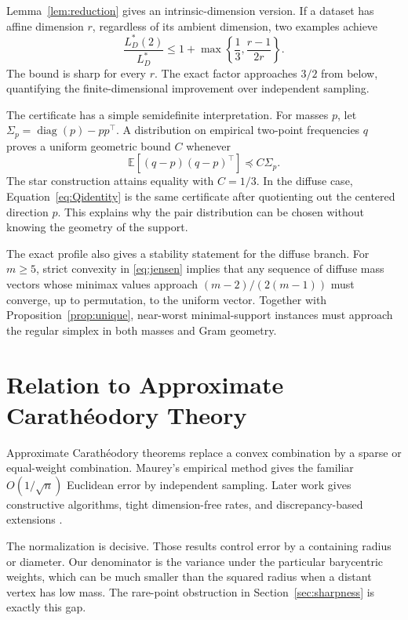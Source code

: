 \documentclass[twoside]{article}
\newcommand{\E}{\mathbb E}
\begin{document}
Lemma~\ref{lem:reduction} gives an intrinsic-dimension version. If a dataset has affine dimension $r$, regardless of its ambient dimension, two examples achieve
\begin{equation}\label{eq:intrinsic}
 \frac{L_D^*(2)}{L_D^*}
 \leq1+\max\left\{\frac13,\frac{r-1}{2r}\right\}.
\end{equation}
The bound is sharp for every $r$. The exact factor approaches $3/2$ from below, quantifying the finite-dimensional improvement over independent sampling.

The certificate has a simple semidefinite interpretation. For masses $p$, let $\Sigma_p=\operatorname{diag}(p)-pp^\top$. A distribution on empirical two-point frequencies $q$ proves a uniform geometric bound $C$ whenever \[ \E[(q-p)(q-p)^\top]\preceq C\Sigma_p. \] The star construction attains equality with $C=1/3$. In the diffuse case, Equation~\eqref{eq:Qidentity} is the same certificate after quotienting out the centered direction $p$. This explains why the pair distribution can be chosen without knowing the geometry of the support.

The exact profile also gives a stability statement for the diffuse branch. For $m\geq5$, strict convexity in \eqref{eq:jensen} implies that any sequence of diffuse mass vectors whose minimax values approach $(m-2)/(2(m-1))$ must converge, up to permutation, to the uniform vector. Together with Proposition~\ref{prop:unique}, near-worst minimal-support instances must approach the regular simplex in both masses and Gram geometry.

\section{Relation to Approximate Carath\'eodory Theory}

Approximate Carath\'eodory theorems replace a convex combination by a sparse or equal-weight combination. Maurey's empirical method gives the familiar $O(1/\sqrt n)$ Euclidean error by independent sampling. Later work gives constructive algorithms, tight dimension-free rates, and discrepancy-based extensions \citep{mirrokni2017tight,combettes2023revisiting, reis2022discrepancy}.

The normalization is decisive. Those results control error by a containing radius or diameter. Our denominator is the variance under the particular barycentric weights, which can be much smaller than the squared radius when a distant vertex has low mass. The rare-point obstruction in Section~\ref{sec:sharpness} is exactly this gap.
\end{document}
